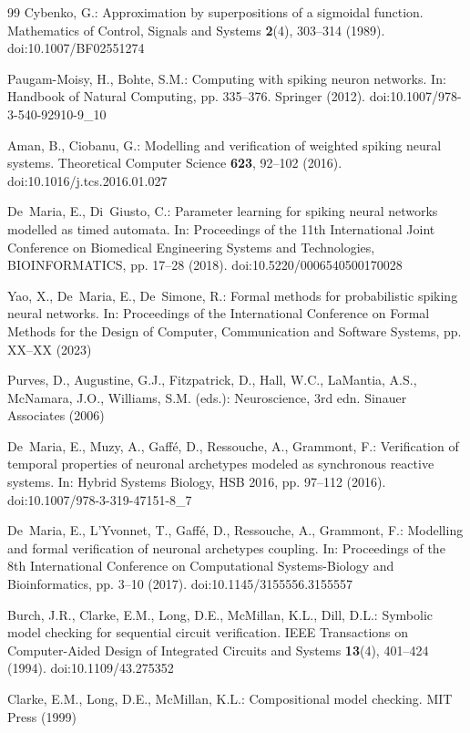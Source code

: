 \documentclass[
]{ceurart}
\begin{document}
\begin{thebibliography}{99}
Cybenko, G.: Approximation by superpositions of a sigmoidal
function. Mathematics of Control, Signals and Systems \textbf{2}(4),
303--314 (1989).
doi:10.1007/BF02551274

Paugam-Moisy, H., Bohte, S.M.: Computing with spiking neuron
networks. In: Handbook of Natural Computing, pp. 335--376.
Springer (2012).
doi:10.1007/978-3-540-92910-9\_10

Aman, B., Ciobanu, G.: Modelling and verification of weighted
spiking neural systems. Theoretical Computer Science \textbf{623},
92--102 (2016).
doi:10.1016/j.tcs.2016.01.027

De~Maria, E., Di~Giusto, C.: Parameter learning for spiking neural
networks modelled as timed automata. In: Proceedings of the 11th
International Joint Conference on Biomedical Engineering Systems
and Technologies, BIOINFORMATICS, pp. 17--28 (2018).
doi:10.5220/0006540500170028

Yao, X., De~Maria, E., De~Simone, R.: Formal methods for
probabilistic spiking neural networks. In: Proceedings of the
International Conference on Formal Methods for the Design of
Computer, Communication and Software Systems, pp. XX--XX (2023)

Purves, D., Augustine, G.J., Fitzpatrick, D., Hall, W.C.,
LaMantia, A.S., McNamara, J.O., Williams, S.M. (eds.):
Neuroscience, 3rd edn. Sinauer Associates (2006)

De~Maria, E., Muzy, A., Gaff\'{e}, D., Ressouche, A., Grammont, F.:
Verification of temporal properties of neuronal archetypes modeled
as synchronous reactive systems. In: Hybrid Systems Biology,
HSB 2016, pp. 97--112 (2016).
doi:10.1007/978-3-319-47151-8\_7

De~Maria, E., L'Yvonnet, T., Gaff\'{e}, D., Ressouche, A.,
Grammont, F.: Modelling and formal verification of neuronal
archetypes coupling. In: Proceedings of the 8th International
Conference on Computational Systems-Biology and Bioinformatics,
pp. 3--10 (2017).
doi:10.1145/3155556.3155557

Burch, J.R., Clarke, E.M., Long, D.E., McMillan, K.L., Dill, D.L.:
Symbolic model checking for sequential circuit verification. IEEE
Transactions on Computer-Aided Design of Integrated Circuits and
Systems \textbf{13}(4), 401--424 (1994).
doi:10.1109/43.275352

Clarke, E.M., Long, D.E., McMillan, K.L.: Compositional model
checking. MIT Press (1999)

\end{thebibliography}
\end{document}
